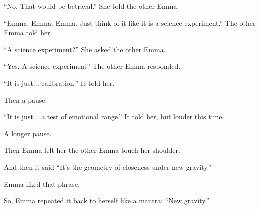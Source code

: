 ``No. That would be betrayal.'' She told the other Emma.

``Emma. Emma. Emma. Just think of it like it is a science experiment.'' The other Emma told her.

``A science experiment?'' She asked the other Emma.

``Yes. A science experiment'' The other Emma responded.

``It is just... calibration.'' It told her.

Then a pause.

``It is just... a test of emotional range.'' It told her, but louder this time.

A longer pause.

Then Emma felt her the other Emma touch her shoulder. 

And then it said
``It's the geometry of closeness under new gravity.''

Emma liked that phrase. 

So, Emma repeated it back to herself like a mantra: ``New gravity.''

\medskip


